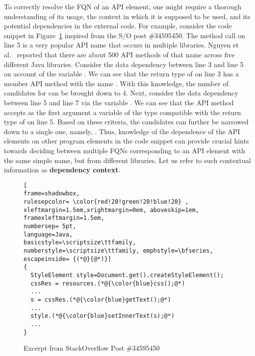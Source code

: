 To correctly resolve the FQN of an API element, one might require a thorough understanding of its usage, the context in which it is supposed to be used, and its potential dependencies in the external code. For example, consider the code snippet in Figure~\ref{fig:excerpt-example1} inspired from the S/O post \#34595450. The  method call on line 5 is a very popular API name that occurs in multiple libraries. Nguyen et al.~\cite{icse18} reported that there are about 500 API methods of that name across five different Java libraries. Consider the data dependency between line 3 and line 5 on account of the variable . We can see that the return type of  on line 3 has a member API method with the name . With this knowledge, the number of candidates for  can be brought down to 4. Next, consider the data dependency between line 5 and line 7 via the variable . We can see that the API method  accepts as the first argument a variable of the type compatible with the return type of  on line 5. Based on these criteria, the candidates can further be narrowed down to a single one, namely, . Thus, knowledge of the dependence of the API elements on other program elements in the code snippet can provide crucial hints towards deciding between multiple FQNs corresponding to an API element with the same simple name, but from different libraries. Let us refer to such contextual information as \textbf{dependency context}.


\begin{figure}
\begin{lstlisting}[
frame=shadowbox,
rulesepcolor= \color{red!20!green!20!blue!20} ,
xleftmargin=1.5em,xrightmargin=0em, aboveskip=1em,
framexleftmargin=1.5em,
numbersep= 5pt,
language=Java,
basicstyle=\scriptsize\ttfamily, numberstyle=\scriptsize\ttfamily, emphstyle=\bfseries, escapeinside= {(*@}{@*)}]
{
  StyleElement style=Document.get().createStyleElement();
  cssRes = resources.(*@{\color{blue}css();@*)
  ...
  s = cssRes.(*@{\color{blue}getText();@*)
  ...
  style.(*@{\color{blue}setInnerText(s);@*)
  ...
}                
\end{lstlisting}
\vspace{-12pt}
\caption{Excerpt from StackOverflow Post \#34595450} %
\label{fig:excerpt-example1}
\end{figure}


